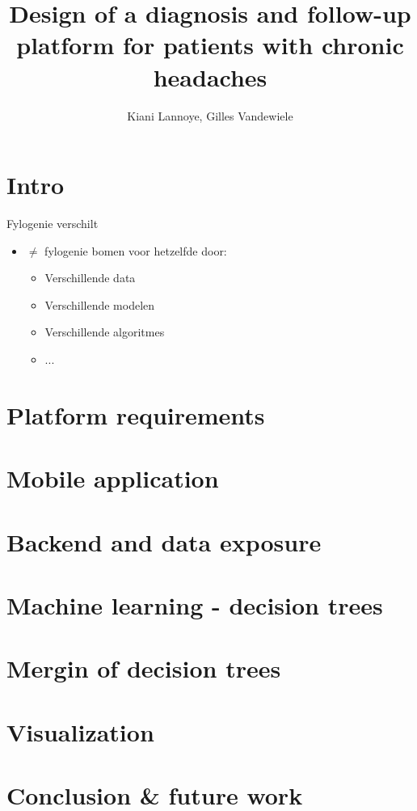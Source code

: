 \documentclass[english]{beamer}
\title{Design of a diagnosis and follow-up platform for patients with chronic headaches}
\author{Kiani Lannoye, Gilles Vandewiele}
\begin{document}
\begin{frame}
	\titlepage
\end{frame}
\section{Intro}
\label{sec:intro}
\begin{frame}{Fylogenie verschilt}
\begin{itemize}
	\item $\neq$ fylogenie bomen voor hetzelfde door:
	\begin{itemize}
		\item Verschillende data
		\item Verschillende modelen
		\item Verschillende algoritmes
		\item ...
	\end{itemize}
\end{itemize}
\end{frame}
\section{Platform requirements}
\label{sec:simMess}
\section{Mobile application}
\section{Backend and data exposure}
\section{Machine learning - decision trees}
\section{Mergin of decision trees}
\section{Visualization}
\section{Conclusion \& future work}




\end{document}
